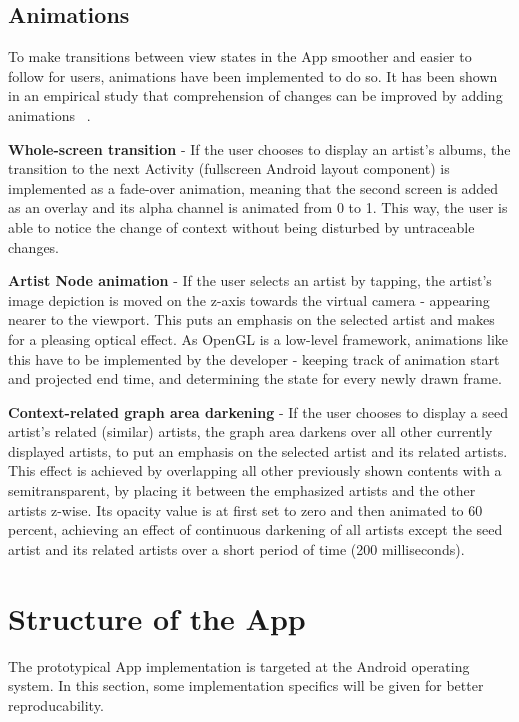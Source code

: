 \subsection{Animations}

To make transitions between view states in the App smoother and easier to follow for users, animations have been implemented to do so. It has been shown in an empirical study that comprehension of changes can be improved by adding animations ~\cite{Schlienger:2007}.

\textbf{Whole-screen transition} - If the user chooses to display an artist's albums, the transition to the next Activity (fullscreen Android layout component) is implemented as a fade-over animation, meaning that the second screen is added as an overlay and its alpha channel is animated from 0 to 1. This way, the user is able to notice the change of context without being disturbed by untraceable changes.

\textbf{Artist Node animation} - If the user selects an artist by tapping, the artist's image depiction is moved on the z-axis towards the virtual camera - appearing nearer to the viewport. This puts an emphasis on the selected artist and makes for a pleasing optical effect. As OpenGL is a low-level framework, animations like this have to be implemented by the developer - keeping track of animation start and projected end time, and determining the state for every newly drawn frame.

\textbf{Context-related graph area darkening} - If the user chooses to display a seed artist's related (similar) artists, the graph area darkens over all other currently displayed artists, to put an emphasis on the selected artist and its related artists. This effect is achieved by overlapping all other previously shown contents with a semitransparent, by placing it between the emphasized artists and the other artists z-wise. Its opacity value is at first set to zero and then animated to 60 percent, achieving an effect of continuous darkening of all artists except the seed artist and its related artists over a short period of time (200 milliseconds).

\section{Structure of the App}

The prototypical App implementation is targeted at the Android operating system. In this section, some implementation specifics will be given for better reproducability.

